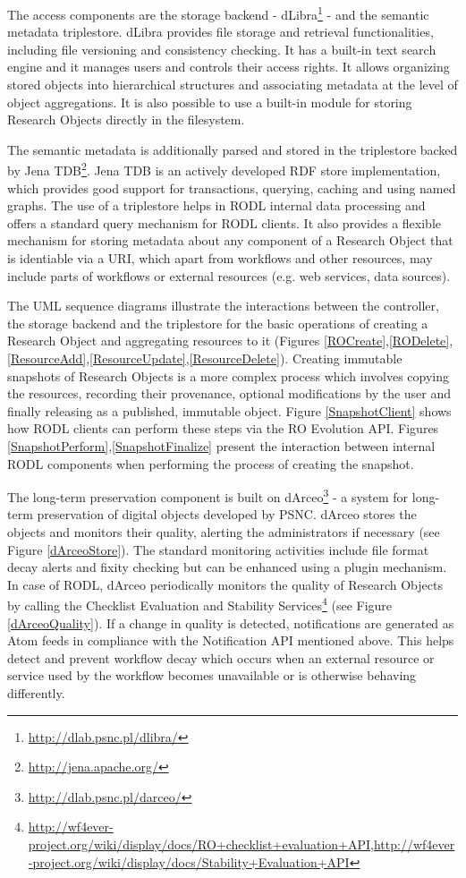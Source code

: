The access components are the storage backend - dLibra\footnote{\url{http://dlab.psnc.pl/dlibra/}} - and the semantic metadata triplestore. dLibra provides file storage and retrieval functionalities, including file versioning and consistency checking. It has a built-in text search engine and it manages users and controls their access rights. It allows organizing stored objects into hierarchical structures and associating metadata at the level of object aggregations. It is also possible to use a built-in module for storing Research Objects directly in the filesystem.

The semantic metadata is additionally parsed and stored in the triplestore backed by Jena TDB\footnote{\url{http://jena.apache.org/}}. Jena TDB is an actively developed RDF store implementation, which provides good support for transactions, querying, caching and using named graphs. The use of a triplestore helps in RODL internal data processing and offers a standard query mechanism for RODL clients. It also provides a flexible mechanism for storing metadata about any component of a Research Object that is identiable via a URI, which apart from workflows and other resources, may include parts of workflows or external resources (e.g. web services, data sources).

The UML sequence diagrams illustrate the interactions between the controller, the storage backend and the triplestore for the basic operations of creating a Research Object and aggregating resources to it (Figures \ref{ROCreate},\ref{RODelete},\ref{ResourceAdd},\ref{ResourceUpdate},\ref{ResourceDelete}). Creating immutable snapshots of Research Objects is a more complex process which involves copying the resources, recording their provenance, optional modifications by the user and finally releasing as a published, immutable object. Figure \ref{SnapshotClient} shows how RODL clients can perform these steps via the RO Evolution API. Figures \ref{SnapshotPerform},\ref{SnapshotFinalize} present the interaction between internal RODL components when performing the process of creating the snapshot.

The long-term preservation component is built on dArceo\footnote{\url{http://dlab.psnc.pl/darceo/}} - a system for long-term preservation of digital objects developed by PSNC. dArceo stores the objects and monitors their quality, alerting the administrators if necessary (see Figure \ref{dArceoStore}). The standard monitoring activities include file format decay alerts and fixity checking but can be enhanced using a plugin mechanism. In case of RODL, dArceo periodically monitors the quality of Research Objects by calling the Checklist Evaluation and Stability Services\footnote{\url{http://wf4ever-project.org/wiki/display/docs/RO+checklist+evaluation+API},\url{http://wf4ever-project.org/wiki/display/docs/Stability+Evaluation+API}}  (see Figure \ref{dArceoQuality}). If a change in quality is detected, notifications are generated as Atom feeds in compliance with the Notification API mentioned above. This helps detect and prevent workflow decay which occurs when an external resource or service used by the workflow becomes unavailable or is otherwise behaving differently.

